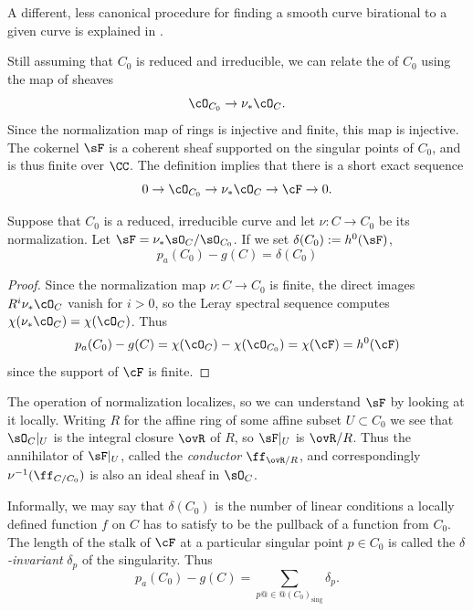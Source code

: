A different, less canonical procedure for finding a smooth curve birational to a given curve
is explained in 
.


Still assuming that $C_0$ is reduced and irreducible, we can relate
%
%
%
the
of $C_0$ using the map of sheaves
$$
\cO_{C_0} \to \nu_*\cO_C.
$$
Since the normalization map of rings  is injective and finite, this map is injective. The cokernel $\sF$ is a coherent sheaf supported on the singular points of $C_0$, and is thus finite over $\CC$. 
The definition implies that there is a short exact sequence
$$
0 \to \cO_{C_0} \to \nu_*\cO_C \to \cF \to 0.
$$

\begin{proposition}\label{pa and delta}
Suppose that $C_{0}$ is a reduced, irreducible curve and let  $\nu: C\to C_{0}$ be its normalization.
Let $\sF = \nu_{*}\sO_{C}/\sO_{C_{0}}$. If we set 
$\delta(C_{0}) := h^{0}(\sF)$, 
 $$
p_a(C_0) - g(C) =  \delta(C_{0})
$$ 
\end{proposition}

\begin{proof}
 Since the normalization map $\nu: C \to C_0$ is finite,  the direct images $R^i\nu_*\cO_C$ vanish for $i > 0$, 
so the Leray spectral sequence 
computes $\chi(\nu_*\cO_C) = \chi(\cO_C)$. Thus
$$
p_a(C_0) - g(C) =  \chi(\cO_{C}) -   \chi(\cO_{C_0}) = \chi(\cF) = h^0(\cF) 
$$ 
since the support of $\cF$ is finite.
\end{proof}

The operation of normalization localizes, so we can understand $\sF$ by looking at it locally.
Writing $R$ for the affine ring of some affine subset $U\subset C_{0}$ we see that $\sO_{C}|_{U}$
is the integral closure $\ovR$ of $R$, so $\sF|_{U}$ is $\ovR/R$. Thus
the annihilator of $\sF|_{U}$, called the \emph{conductor}
$\ff_{\ovR/R}$,
and correspondingly $\nu^{-1}(\ff_{C/C_{0}})$ 
is also an ideal sheaf in $\sO_{C}$.

Informally, we may say that $\delta(C_{0})$ is the number of linear
conditions a locally defined function $f$ on $C$ has to satisfy to be
the pullback of a function from $C_0$. The length of the stalk of
$\cF$ at a particular singular point $p \in C_0$ is called the
\emph{$\delta$-invariant} $\delta_p$ of the singularity. Thus 
$$
p_a(C_0) - g(C) = \sum_{p @\in@ (C_0)_{\mathrm{sing}}\!\!} \delta_p.
$$ 


